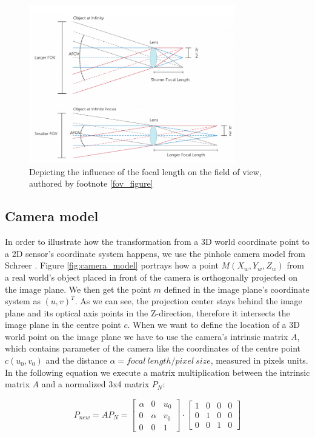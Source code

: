 \begin{figure}
\centering
\includegraphics[width=0.8\textwidth]{images/camera_fov.png}
\caption[Single camera's FoV]{Depicting the influence of the focal length on the field of view, authored by footnote \ref{fov_figure} \label{fig:camera_fov}}
\end{figure}

\subsection{Camera model}\label{camera_model}
In order to illustrate how the transformation from a 3D world coordinate point to a 2D sensor's coordinate system happens, we use the pinhole camera model from Schreer \cite{camera_pinhole_model}. Figure \ref{fig:camera_model} portrays how a point $M(X_{w}, Y_{w}, Z_{w})$ from a real world's object placed in front of the camera is orthogonally projected on the image plane. We then get the point $m$ defined in the image plane's coordinate system as $(u,v)^{T}$. As we can see, the projection center stays behind the image plane and its optical axis points in the Z-direction, therefore it intersects the image plane in the centre point $c$. When we want to define the location of a 3D world point on the image plane we have to use the camera's intrinsic matrix $A$, which contains parameter of the camera like the coordinates of the centre point $c(u_{0},v_{0})$ and the distance $\alpha = focal \: length / pixel \: size$, measured in pixels units. In the following equation we execute a matrix multiplication between the intrinsic matrix $A$ and a normalized 3x4 matrix $P_{N}$:

\begin{equation}
    P_{new} = A P_{N} = \begin{bmatrix}
                        \alpha & 0 & u_{0}\\
                        0 & \alpha & v_{0}\\
                        0 & 0 & 1\end{bmatrix} \cdot \begin{bmatrix}
                        1 & 0 & 0 & 0\\
                        0 & 1 & 0 & 0\\
                        0 & 0 & 1 & 0\end{bmatrix}
\end{equation}


